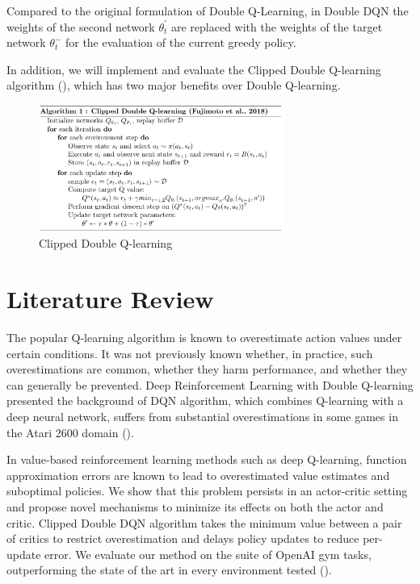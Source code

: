 \documentclass{article}
\begin{document}
Compared to the original formulation of Double Q-Learning, in Double DQN the
weights of the second network $\theta _{t}^{'}$ are replaced with the weights of
the target network $\theta_{t}^{-}$ for the evaluation of the current greedy
policy.

In addition, we will implement and evaluate the Clipped Double Q-learning
algorithm (\citet{fujimoto2018addressing}), which has two major benefits over
Double Q-learning.

\begin{figure}[!htbp]
    \begin{center}
    \includegraphics[width=8cm]{alg1_ClippedDDQ_Fujimoto.png}
    \end{center}
    \caption{Clipped Double Q-learning}
    \label{fig:numcomments}
\end{figure}

\section{Literature Review}

The popular Q-learning algorithm is known to overestimate action values under
certain conditions. It was not previously known whether, in practice, such
overestimations are common, whether they harm performance, and whether they can
generally be prevented. Deep Reinforcement Learning with Double Q-learning
presented the background of DQN algorithm, which combines Q-learning with a deep
neural network, suffers from substantial overestimations in some games in the
Atari 2600 domain (\citet{mnih2013playing}).

In value-based reinforcement learning methods such as deep Q-learning, function
approximation errors are known to lead to overestimated value estimates and
suboptimal policies. We show that this problem persists in an actor-critic
setting and propose novel mechanisms to minimize its effects on both the actor
and critic. Clipped Double DQN algorithm takes the minimum value between a pair
of critics to restrict overestimation and delays policy updates to reduce
per-update error. We evaluate our method on the suite of OpenAI gym tasks,
outperforming the state of the art in every environment tested
(\citet{fujimoto2018addressing}).


\end{document}
